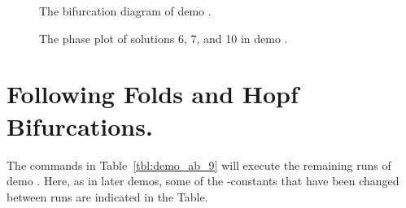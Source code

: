 \begin{figure}[p]
\epsfysize 9.0cm
\centerline{}
\caption{The bifurcation diagram of demo .}
\label{fig:ab_1}
\end{figure}
\begin{figure}[p]
\epsfysize 9.0cm
\centerline{}
\caption{The phase plot of solutions 6, 7, and 10 in demo .}
\label{fig:ab_2}
\end{figure}


\section{ Following Folds and Hopf Bifurcations.} \label{sec:Tutorial_2_par}
The commands in Table~\ref{tbl:demo_ab_9} will execute the remaining
runs of demo .
Here, as in later demos, some of the \AUTO-constants that have been changed
between runs are indicated in the Table.

